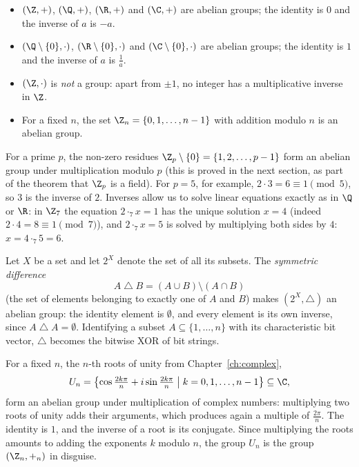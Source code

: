 \begin{example}
\hfill
\begin{itemize}
\item $(\Z,+)$, $(\Q,+)$, $(\R,+)$ and $(\C,+)$ are abelian groups; the identity is $0$ and the inverse of
$a$ is $-a$.
\item $(\Q\setminus\{0\},\cdot)$, $(\R\setminus\{0\},\cdot)$ and $(\C\setminus\{0\},\cdot)$ are abelian
groups; the identity is $1$ and the inverse of $a$ is $\tfrac{1}{a}$.
\item $(\Z,\cdot)$ is \emph{not} a group: apart from $\pm 1$, no integer has a multiplicative inverse in
$\Z$.
\item For a fixed $n$, the set $\Z_n=\{0,1,\ldots,n-1\}$ with addition modulo $n$ is an abelian group.
\end{itemize}
\end{example}

\begin{example}
For a prime $p$, the non-zero residues $\Z_p\setminus\{0\}=\{1,2,\ldots,p-1\}$ form an abelian group under
multiplication modulo $p$ (this is proved in the next section, as part of the theorem that $\Z_p$ is a
field). For $p=5$, for example, $2\cdot 3 = 6 \equiv 1 \pmod 5$, so $3$ is the inverse of
$2$. Inverses allow us to solve linear equations exactly as in $\Q$ or $\R$: in $\Z_7$ the equation
$2\cdot_7 x = 1$ has the unique solution $x = 4$ (indeed $2\cdot 4 = 8 \equiv 1 \pmod 7$), and
$2 \cdot_7 x = 5$ is solved by multiplying both sides by $4$: $x = 4\cdot_7 5 = 6$.
\end{example}

\begin{example}
Let $X$ be a set and let $2^X$ denote the set of all its subsets. The \emph{symmetric difference}
\[
A \bigtriangleup B = (A\cup B)\setminus (A\cap B)
\]
(the set of elements belonging to exactly one of $A$ and $B$) makes $(2^X,\bigtriangleup)$ an abelian
group: the identity element is $\emptyset$, and every element is its own inverse, since
$A \bigtriangleup A = \emptyset$. Identifying a subset $A\subseteq \{1,\ldots,n\}$ with its characteristic
bit vector, $\bigtriangleup$ becomes the bitwise XOR of bit strings.
\end{example}

\begin{example}
For a fixed $n$, the $n$-th roots of unity from Chapter~\ref{ch:complex},
\[
U_n = \left\{\cos\tfrac{2k\pi}{n} + i \sin\tfrac{2k\pi}{n} \;\middle|\; k = 0,1,\ldots,n-1\right\}\subseteq\C,
\]
form an abelian group under multiplication of complex numbers: multiplying two roots of unity adds their
arguments, which produces again a multiple of $\tfrac{2\pi}{n}$. The identity is $1$, and the inverse of a
root is its conjugate. Since multiplying the roots amounts to adding the exponents $k$ modulo $n$, the
group $U_n$ is the group $(\Z_n,+_n)$ in disguise.
\end{example}

